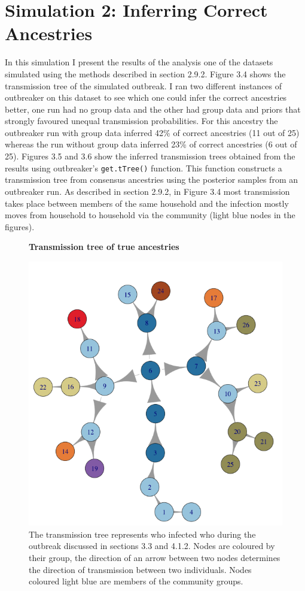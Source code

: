 \documentclass[11pt,a4paper]{report}
\begin{document}
\section{Simulation 2: Inferring Correct Ancestries}
In this simulation I present the results of the analysis one of the datasets simulated using the methods described in section 2.9.2. Figure 3.4 shows the transmission tree of the simulated outbreak. I ran two different instances of outbreaker on this dataset to see which one could infer the correct ancestries better, one run had no group data and the other had group data and priors that strongly favoured unequal transmission probabilities. For this ancestry the outbreaker run with group data inferred 42\% of correct ancestries (11 out of 25) whereas the run without group data inferred 23\% of correct ancestries (6 out of 25). Figures 3.5 and 3.6 show the inferred transmission trees obtained from the results using outbreaker's {\tt get.tTree()} function. This function constructs a transmission tree from consensus ancestries using the posterior samples from an outbreaker run. As described in section 2.9.2, in Figure 3.4 most transmission takes place between members of the same household and the infection mostly moves from household to household via the community (light blue nodes in the figures).
\begin{figure}
\centering
{\bf Transmission tree of true ancestries}
\caption{The transmission tree represents who infected who during the outbreak discussed in sections 3.3 and 4.1.2. Nodes are coloured by their group, the direction of an arrow between two nodes determines the direction of transmission between two individuals. Nodes coloured light blue are members of the community groups.}
\includegraphics[scale=0.5]{ancestree.png}
\end{figure}
\end{document}
